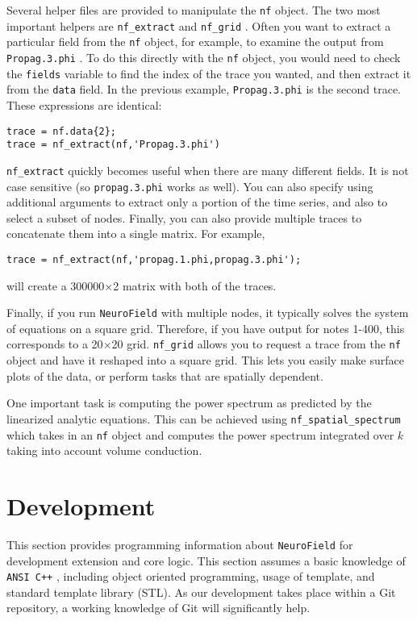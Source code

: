 \documentclass[12pt,a4paper]{article}
\newcommand{\type}[1]{ {\small\small\tt #1} }
\newcommand{\NF}[0]{ \type{NeuroField}}
\begin{document}
Several helper files are provided to manipulate the \type{nf} object. The two most important helpers are \type{nf\_extract} and \type{nf\_grid}. Often you want to extract a particular field from the \type{nf} object, for example, to examine the output from \type{Propag.3.phi}. To do this directly with the \type{nf} object, you would need to check the \type{fields} variable to find the index of the trace you wanted, and then extract it from the \type{data} field. In the previous example, \type{Propag.3.phi} is the second trace. These expressions are identical:
\begin{lstlisting}
trace = nf.data{2};
trace = nf_extract(nf,'Propag.3.phi')
\end{lstlisting}
\type{nf\_extract} quickly becomes useful when there are many different fields. It is not case sensitive (so \type{propag.3.phi} works as well). You can also specify using additional arguments to extract only a portion of the time series, and also to select a subset of nodes. Finally, you can also provide multiple traces to concatenate them into a single matrix. For example,
\begin{lstlisting}
trace = nf_extract(nf,'propag.1.phi,propag.3.phi');
\end{lstlisting}
will create a 300000$\times$2 matrix with both of the traces. 

Finally, if you run \NF with multiple nodes, it typically solves the system of equations on a square grid. Therefore, if you have output for notes 1-400, this corresponds to a 20$\times$20 grid. \type{nf\_grid} allows you to request a trace from the \type{nf} object and have it reshaped into a square grid. This lets you easily make surface plots of the data, or perform tasks that are spatially dependent. 

One important task is computing the power spectrum as predicted by the linearized analytic equations. This can be achieved using \type{nf\_spatial\_spectrum} which takes in an \type{nf} object and computes the power spectrum integrated over $k$ taking into account volume conduction. 

\section{Development}

This section provides programming information about \NF for development extension and core logic. This section assumes a basic knowledge of \type{ANSI C++}, including object oriented programming, usage of template, and standard template library (STL). As our development takes place within a Git repository, a working knowledge of Git will significantly help. 
\end{document}
